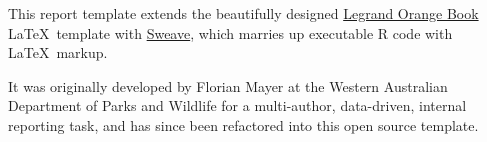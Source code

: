 This report template extends the beautifully designed
\href{http://www.latextemplates.com/template/the-legrand-orange-book}{Legrand Orange Book}
\LaTeX\ template with \href{https://www.statistik.lmu.de/~leisch/Sweave/}{Sweave},
which marries up executable R code with \LaTeX\ markup.

It was originally developed by Florian Mayer at the Western Australian Department
of Parks and Wildlife for a multi-author, data-driven, internal reporting task,
and has since been refactored into this open source template.

